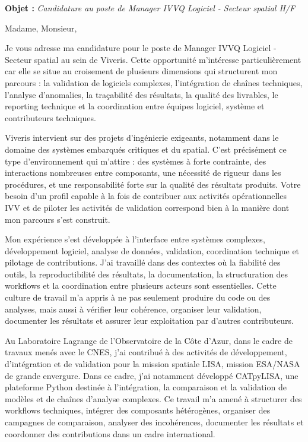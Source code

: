 \documentclass[11pt,a4paper]{altacv}
\begin{document}
\makecvheader
\vspace{-0.6cm}

\vspace{-0.4cm}

{\color{accent}\textbf{Objet :}} \textit{Candidature au poste de Manager IVVQ Logiciel - Secteur spatial H/F}

{\color{body}

Madame, Monsieur,

Je vous adresse ma candidature pour le poste de Manager IVVQ Logiciel - Secteur spatial au sein de Viveris. Cette opportunité m'intéresse particulièrement car elle se situe au croisement de plusieurs dimensions qui structurent mon parcours : la validation de logiciels complexes, l'intégration de chaînes techniques, l'analyse d'anomalies, la traçabilité des résultats, la qualité des livrables, le reporting technique et la coordination entre équipes logiciel, système et contributeurs techniques.

Viveris intervient sur des projets d'ingénierie exigeants, notamment dans le domaine des systèmes embarqués critiques et du spatial. C'est précisément ce type d'environnement qui m'attire : des systèmes à forte contrainte, des interactions nombreuses entre composants, une nécessité de rigueur dans les procédures, et une responsabilité forte sur la qualité des résultats produits. Votre besoin d'un profil capable à la fois de contribuer aux activités opérationnelles IVV et de piloter les activités de validation correspond bien à la manière dont mon parcours s'est construit.

Mon expérience s'est développée à l'interface entre systèmes complexes, développement logiciel, analyse de données, validation, coordination technique et pilotage de contributions. J'ai travaillé dans des contextes où la fiabilité des outils, la reproductibilité des résultats, la documentation, la structuration des workflows et la coordination entre plusieurs acteurs sont essentielles. Cette culture de travail m'a appris à ne pas seulement produire du code ou des analyses, mais aussi à vérifier leur cohérence, organiser leur validation, documenter les résultats et assurer leur exploitation par d'autres contributeurs.

Au Laboratoire Lagrange de l'Observatoire de la Côte d'Azur, dans le cadre de travaux menés avec le CNES, j'ai contribué à des activités de développement, d'intégration et de validation pour la mission spatiale LISA, mission ESA/NASA de grande envergure. Dans ce cadre, j'ai notamment développé CATpyLISA, une plateforme Python destinée à l'intégration, la comparaison et la validation de modèles et de chaînes d'analyse complexes. Ce travail m'a amené à structurer des workflows techniques, intégrer des composants hétérogènes, organiser des campagnes de comparaison, analyser des incohérences, documenter les résultats et coordonner des contributions dans un cadre international.

}
\end{document}
